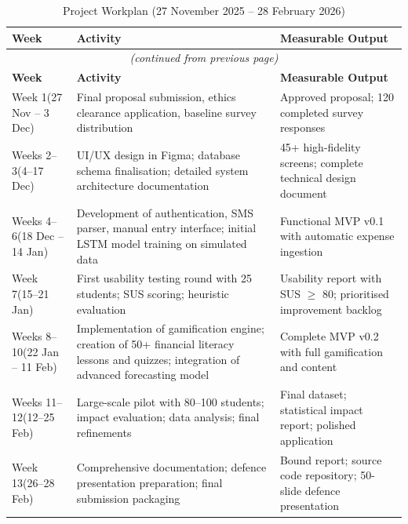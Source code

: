 \documentclass[12pt,a4paper]{report}
\begin{document}
\begin{longtable}{p{2.2cm} p{4.5cm} p{5cm}}
\caption{Project Workplan (27 November 2025 -- 28 February 2026)}
\label{tab:workplan}\\
\toprule
\textbf{Week} & \textbf{Activity} & \textbf{Measurable Output} \\
\midrule
\endfirsthead
\multicolumn{3}{c}{\small\itshape (continued from previous page)}\\
\toprule
\textbf{Week} & \textbf{Activity} & \textbf{Measurable Output} \\
\midrule
\endhead
\bottomrule
\endfoot
\bottomrule
\endlastfoot
Week 1\newline(27 Nov -- 3 Dec) & Final proposal submission, ethics clearance application, baseline survey distribution & Approved proposal; 120 completed survey responses \\[4pt]
Weeks 2--3\newline(4--17 Dec) & UI/UX design in Figma; database schema finalisation; detailed system architecture documentation & 45+ high-fidelity screens; complete technical design document \\[4pt]
Weeks 4--6\newline(18 Dec -- 14 Jan) & Development of authentication, SMS parser, manual entry interface; initial LSTM model training on simulated data & Functional MVP v0.1 with automatic expense ingestion \\[4pt]
Week 7\newline(15--21 Jan) & First usability testing round with 25 students; SUS scoring; heuristic evaluation & Usability report with SUS $\geq$ 80; prioritised improvement backlog \\[4pt]
Weeks 8--10\newline(22 Jan -- 11 Feb) & Implementation of gamification engine; creation of 50+ financial literacy lessons and quizzes; integration of advanced forecasting model & Complete MVP v0.2 with full gamification and content \\[4pt]
Weeks 11--12\newline(12--25 Feb) & Large-scale pilot with 80--100 students; impact evaluation; data analysis; final refinements & Final dataset; statistical impact report; polished application \\[4pt]
Week 13\newline(26--28 Feb) & Comprehensive documentation; defence presentation preparation; final submission packaging & Bound report; source code repository; 50-slide defence presentation \\
\end{longtable}
\end{document}
